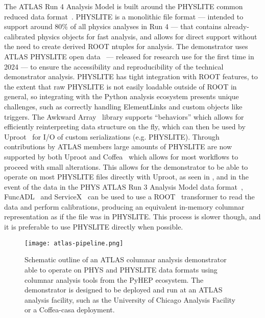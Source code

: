 The ATLAS Run 4 Analysis Model is built around the PHYSLITE common reduced data format~\cite{Schaarschmidt:2024vzr,SOFT-2022-02}.
PHYSLITE is a monolithic file format --- intended to support around 80\% of all physics analyses in Run 4 --- that contains already-calibrated physics objects for fast analysis, and allows for direct support without the need to create derived ROOT ntuples for analysis.
The demonstrator uses ATLAS PHYSLITE open data~\cite{ATL-OREACH-PROC-2024-005} --- released for research use for the first time in 2024 --- to ensure the accessibility and reproducibility of the technical demonstrator analysis.
PHYSLITE has tight integration with ROOT features, to the extent that raw PHYSLITE is not easily loadable outside of ROOT in general, so integrating with the Python analysis ecosystem presents unique challenges, such as correctly handling ElementLinks and custom objects like triggers.
The Awkward Array~\cite{Awkward_Array_2018} library supports ``behaviors'' which allows for efficiently reinterpreting data structure on the fly, which can then be used by Uproot~\cite{Uproot_2017} for I/O of custom serializations (e.g. PHYSLITE).
Through contributions by ATLAS members large amounts of PHYSLITE are now supported by both Uproot and Coffea~\cite{Coffea_2023,CMS:2020kpn} which allows for most workflows to proceed with small alterations.
This allows for the demonstrator to be able to operate on most PHYSLITE files directly with Uproot, as seen in , and in the event of the data in the PHYS ATLAS Run 3 Analysis Model data format~\cite{SOFT-2022-02}, FuncADL~\cite{funcadl_2024,Proffitt:2021wfh} and ServiceX~\cite{serviceX_2024,serviceX_client_2024,Galewsky:2020xig} can be used to use a ROOT~\cite{Brun:1997pa} transformer to read the data and perform calibrations, producing an equivalent in-memory columnar representation as if the file was in PHYSLITE.
This process is slower though, and it is preferable to use PHYSLITE directly when possible.

\begin{figure}
    \centering
    \texttt{[image: atlas-pipeline.png]}
    \caption{Schematic outline of an ATLAS columnar analysis demonstrator able to operate on PHYS and PHYSLITE data formats using columnar analysis tools from the PyHEP ecosystem.
    The demonstrator is designed to be deployed and run at an ATLAS analysis facility, such as the University of Chicago Analysis Facility or a Coffea-casa deployment.}
    \label{fig:atlas-pipeline}
\end{figure}
